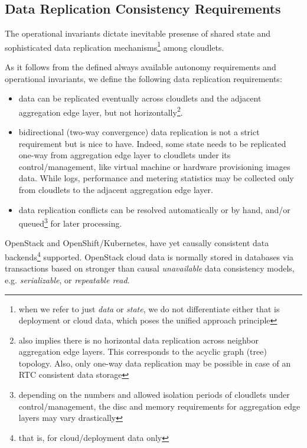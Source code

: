 \documentclass[conference]{IEEEtran}
\begin{document}
\subsection{Data Replication Consistency Requirements}

The operational invariants dictate inevitable presense of shared state and
sophisticated data replication mechanisms\footnote{when we refer to just
\textit{data} or \textit{state}, we do not differentiate either that is
deployment or cloud data, which poses the unified approach principle} among
cloudlets.

As it follows from the defined always available autonomy requirements and
operational invariants, we define the following data replication requirements:

\begin{itemize}
  \item data can be replicated eventually across cloudlets and the adjacent
    aggregation edge layer, but not horizontally\footnote{also implies there is
    no horizontal data replication across neighbor aggregation edge layers.
    This corresponds to the acyclic graph (tree) topology. Also, only one-way
    data replication may be possible in case of an RTC consistent data
    storage}.
  \item bidirectional (two-way convergence) data replication is not a strict
    requirement but is nice to have. Indeed, some state needs to be replicated
    one-way from aggregation edge layer to cloudlets under its
    control/management, like virtual machine or hardware provisioning images
    data. While logs, performance and metering statistics may be collected only
    from cloudlets to the adjacent aggregation edge layer.
  \item data replication conflicts can be resolved automatically or by hand,
    and/or queued\footnote{depending on the numbers and allowed isolation
    periods of cloudlets under control/management, the disc and memory
    requirements for aggregation edge layers may vary drastically} for later
    processing.
\end{itemize}

OpenStack and OpenShift/Kubernetes, have yet causally consistent data
backends\footnote{that is, for cloud/deployment data only} supported.
OpenStack cloud data is normally stored in databases via transactions based on
stronger than causal \textit{unavailable}\cite{b4} data consistency models,
e.g.  \textit{serializable}\cite{b4}, or \textit{repeatable read}\cite{b4}.
\end{document}
